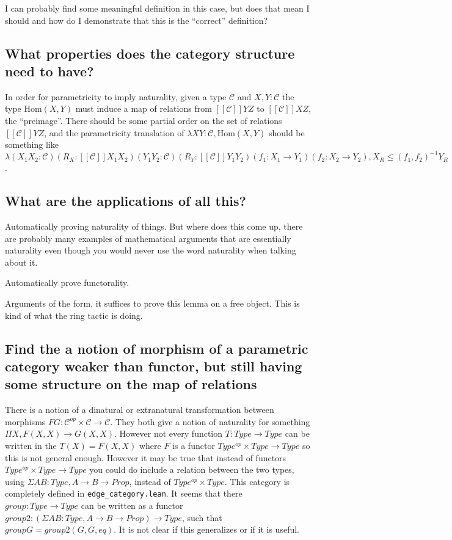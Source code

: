 \documentclass[12pt]{article} %
\theoremstyle{definition}
\theoremstyle{definition}
\theoremstyle{definition}
\theoremstyle{definition}
\begin{document}
I can probably find some meaningful definition in this case, but does that mean I should and how do
I demonstrate that this is the ``correct'' definition?

\subsection{What properties does the category structure need to have?}

In order for parametricity to imply naturality, given a type $\mathcal{C}$ and $X,Y:\mathcal{C}$
the type $\text{Hom}(X,Y)$ must induce a map of relations from $[[\mathcal{C}]] Y Z$ to
$[[\mathcal{C}]] X Z$, the ``preimage''. There should be some partial order on the set of relations
$[[\mathcal{C}]] Y Z$, and the parametricity translation of 
$\lambda X Y : \mathcal{C}, \text{Hom}(X, Y)$ should be something like
$\lambda (X_1 X_2 : \mathcal{C}) (R_X : [[\mathcal{C}]] X_1 X_2) (Y_1 Y_2 : \mathcal{C})
  (R_Y : [[\mathcal{C}]]Y_1 Y_2) (f_1 : X_1 \rightarrow Y_1) (f_2 : X_2 \rightarrow Y_2), 
  X_R \le (f_1, f_2)^{-1}Y_R$.



\subsection{What are the applications of all this?}

Automatically proving naturality of things. But where does this come up, there are probably many examples
of mathematical arguments that are essentially naturality even though you would never use the word naturality
when talking about it.

Automatically prove functorality.

Arguments of the form, it suffices to prove this lemma on a free object. 
This is kind of what the ring tactic is doing.

\subsection{Find the a notion of morphism of a parametric category weaker than functor, but
  still having some structure on the map of relations}

There is a notion of a dinatural or extranatural transformation between morphisms 
$F G : \mathcal{C}^{op} \times \mathcal{C} \rightarrow \mathcal{C}$. They both give 
a notion of naturality for something $\Pi X, F(X, X) \rightarrow G(X,X)$. However not
every function $T : Type \rightarrow Type$ can be written in the $T(X) = F(X, X)$ where 
$F$ is a functor $Type^{op} \times Type \rightarrow Type$ so this is not general enough. 
However it may be true that instead of functors $Type^{op} \times Type \rightarrow Type$
you could do include a relation between the two types, using $\Sigma A B : Type, A \rightarrow B \rightarrow Prop$,
instead of $Type^{op} \times Type$. This category is completely defined in \lstinline{edge_category.lean}.
It seems that there $group : Type \rightarrow Type$ can be written as a functor
$group2 : (\Sigma A B : Type, A \rightarrow B \rightarrow Prop) \rightarrow Type$, such that 
$group G = group2(G, G, eq)$. It is not clear if this generalizes or if it is useful.
\end{document}
